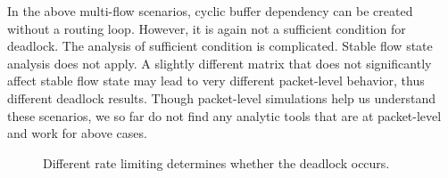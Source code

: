 In the above multi-flow scenarios, cyclic buffer dependency can be created without 
a routing loop. However, it is again not a sufficient condition for deadlock. The analysis of sufficient
condition is complicated. Stable flow state analysis does not apply.
A slightly different matrix that does not significantly affect stable flow state may lead
to very different packet-level behavior, thus different deadlock results. 
Though packet-level simulations help us understand these scenarios, we so far do not find
any analytic tools that are at packet-level and work for above cases.


\begin{figure}[t]
\centering

\vspace{-0.15in}
\caption{Different rate limiting determines whether the deadlock occurs.}
\vspace{-0.15in}
\label{fig:case3}
\end{figure}

